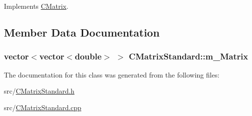 Implements \hyperlink{classCMatrix_aa9f96d82fa2e564f89f35a1781a12d69}{C\+Matrix}.



\subsection{Member Data Documentation}
\subsubsection[{\texorpdfstring{m\+\_\+\+Matrix}{m_Matrix}}]{\setlength{\rightskip}{0pt plus 5cm}vector$<$vector$<$double$>$ $>$ C\+Matrix\+Standard\+::m\+\_\+\+Matrix\hspace{0.3cm}{\ttfamily [private]}}\hypertarget{classCMatrixStandard_a4b0bafe59e3358e0d3fdbcc42b584dec}{}\label{classCMatrixStandard_a4b0bafe59e3358e0d3fdbcc42b584dec}


The documentation for this class was generated from the following files\+:\begin{DoxyCompactItemize}
\item 
src/\hyperlink{CMatrixStandard_8h}{C\+Matrix\+Standard.\+h}\item 
src/\hyperlink{CMatrixStandard_8cpp}{C\+Matrix\+Standard.\+cpp}\end{DoxyCompactItemize}
